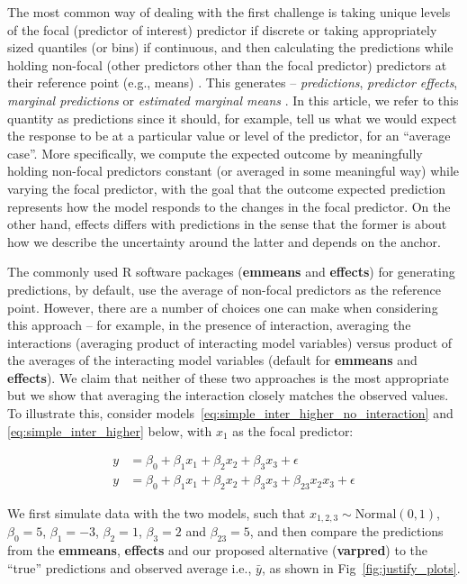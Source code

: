 \documentclass[10pt,letterpaper]{article}
\newcommand{\pkg}[1]{\textbf{#1}}
\let\proglang=\textsf
\begin{document}
The most common way of dealing with the first challenge is taking unique levels of the focal (predictor of interest) predictor if discrete or taking appropriately sized quantiles (or bins) if continuous, and then calculating the predictions while holding non-focal (other predictors other than the focal predictor) predictors at their reference point (e.g., means) \cite{hanmer2013behind}. This generates -- \emph{predictions}, \emph{predictor effects}\cite{fox2009effect}, \emph{marginal predictions} \cite{leeper2017package} or \emph{estimated marginal means} \cite{lenth2018package}. In this article, we refer to this quantity as predictions since it should, for example, tell us what we would expect the response to be at a particular value or level of the predictor, for an ``average case''. More specifically, we compute the expected outcome by meaningfully holding non-focal predictors constant (or averaged in some meaningful way) while varying the focal predictor, with the goal that the outcome expected prediction represents how the model responds to the changes in the focal predictor. On the other hand, effects differs with predictions in the sense that the former is about how we describe the uncertainty around the latter and depends on the anchor. 

The commonly used \proglang{R} software packages (\pkg{emmeans} and \pkg{effects}) for generating predictions, by default, use the average of non-focal predictors as the reference point. However, there are a number of choices one can make when considering this approach -- for example, in the presence of interaction, averaging the interactions (averaging product of interacting model variables) versus product of the averages of the interacting model variables (default for \pkg{emmeans} and \pkg{effects}). We claim that neither of these two approaches is the most appropriate but we show that averaging the interaction closely matches the observed values. To illustrate this, consider models~\ref{eq:simple_inter_higher_no_interaction} and \ref{eq:simple_inter_higher} below, with $x_1$ as the focal predictor:

%
\begin{align}
y &= \beta_0 + \beta_1x_1 + \beta_2x_2 + \beta_3x_3 + \epsilon \label{eq:simple_inter_higher_no_interaction}\\
y &= \beta_0 + \beta_1x_1 + \beta_2x_2 + \beta_3x_3 + \beta_{23}x_2x_3 + \epsilon \label{eq:simple_inter_higher}
\end{align}
%

We first simulate data with the two models, such that $x_{1,2,3} \sim \mathrm{Normal}(0, 1)$, $\beta_0 = 5$, $\beta_1 = -3$, $\beta_2 = 1$, $\beta_3 = 2$ and $\beta_{23} = 5$, and then compare the predictions from the \pkg{emmeans}, \pkg{effects} and our proposed alternative (\pkg{varpred}) to the ``true'' predictions and observed average i.e., $\bar{y}$, as shown in Fig~\ref{fig:justify_plots}.
\end{document}
